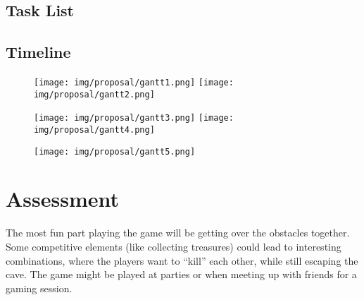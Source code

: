 \subsection{Task List}


\subsection{Timeline}

\begin{figure}[h!]
\centering
    \texttt{[image: img/proposal/gantt1.png]}
    \texttt{[image: img/proposal/gantt2.png]}
\end{figure}    
\begin{figure}[h!]
\centering
    \texttt{[image: img/proposal/gantt3.png]}
    \texttt{[image: img/proposal/gantt4.png]}
\end{figure}
\begin{figure}[h!]
\centering   
    \texttt{[image: img/proposal/gantt5.png]}
\end{figure}

\newpage
\section{Assessment}
The most fun part playing the game will be getting over the obstacles together. Some competitive elements (like collecting treasures) could lead to interesting combinations, where the players want to \enquote{kill} each other, while still escaping the cave.
The game might be played at parties or when meeting up with friends for a gaming session. 
